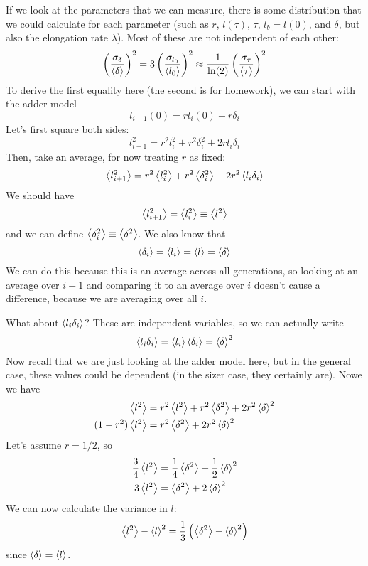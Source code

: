 \documentclass[a4paper,twoside,master.tex]{subfiles}
\begin{document}
If we look at the parameters that we can measure, there is some distribution that we could calculate for each parameter (such as $ r $, $ l(\tau) $, $ \tau $, $ l_b = l(0) $, and $ \delta $, but also the elongation rate $ \lambda $). Most of these are not independent of each other:
\begin{equation}
    \left( \frac{\sigma_{\delta}}{\ev{\delta}} \right)^2 = 3\left( \frac{\sigma_{l_0}}{\ev{l_0}} \right)^2 \approx \frac{1}{\ln(2)} \left( \frac{\sigma_{\tau}}{\ev{\tau}} \right)^2
\end{equation}
To derive the first equality here (the second is for homework), we can start with the adder model
\begin{equation}
    l_{i + 1}(0) = r l_i(0) + r\delta_i \tag{1}
\end{equation}
Let's first square both sides:
\begin{equation}
    l_{i+1}^2 = r^2 l_i^2 + r^2\delta_i^2 + 2rl_i \delta_i
\end{equation}
Then, take an average, for now treating $ r $ as fixed:
\begin{equation}
    \ev{l_{i+1}^2} = r^2 \ev{l_i^2} + r^2\ev{\delta_i^2} + 2r^2 \ev{l_i \delta_i}
\end{equation}
We should have
\begin{equation}
    \ev{l_{i+1}^2} = \ev{l_i^2} \equiv \ev{l^2}
\end{equation}
and we can define $ \ev{\delta_i^2} \equiv \ev{\delta^2} $. We also know that
\begin{equation}
    \ev{\delta_i} = \ev{l_i} = \ev{l} = \ev{\delta}
\end{equation}
We can do this because this is an average across all generations, so looking at an average over $ i+1 $ and comparing it to an average over $ i $ doesn't cause a difference, because we are averaging over all $ i $.

What about $ \ev{l_i \delta_i} $? These are independent variables, so we can actually write
\begin{equation}
    \ev{l_i \delta_i} = \ev{l_i} \ev{\delta_i} = \ev{\delta}^2
\end{equation}
Now recall that we are just looking at the adder model here, but in the general case, these values could be dependent (in the sizer case, they certainly are). Nowe we have
\begin{align}
    \ev{l^2} &= r^2 \ev{l^2} + r^2 \ev{\delta^2} + 2 r^2 \ev{\delta}^2 \\
    (1-r^2) \ev{l^2} &= r^2 \ev{\delta^2} + 2 r^2  \ev{\delta}^2
\end{align}
Let's assume $ r = 1/2 $, so
\begin{align}
    \frac{3}{4} \ev{l^2} &= \frac{1}{4} \ev{\delta^2} + \frac{1}{2}\ev{\delta}^2 \\
    3\ev{l^2} &= \ev{\delta^2} + 2\ev{\delta}^2
\end{align}
We can now calculate the variance in $ l $:
\begin{align}
    \ev{l^2} - \ev{l}^2 = \frac{1}{3} \left( \ev{\delta^2} - \ev{\delta}^2 \right)
\end{align}
since $ \ev{\delta} = \ev{l} $.
\end{document}
